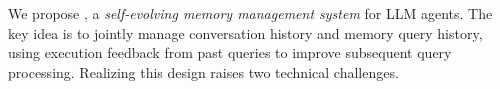 

We propose \sys{}, a \emph{self-evolving memory management system} for LLM agents. The key idea is to jointly manage conversation history and memory query history, using execution feedback from past queries to improve subsequent query processing.
Realizing this design raises two technical challenges.


